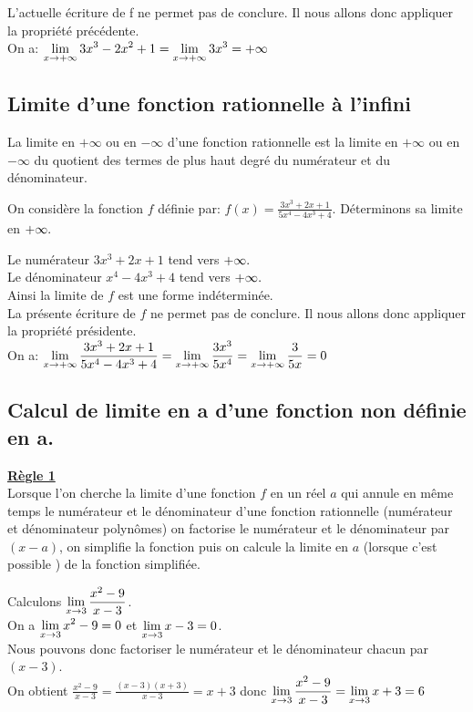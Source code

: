 L'actuelle écriture de f ne permet pas de conclure. Il nous allons donc appliquer la propriété précédente.\\
On a: \; $ \displaystyle \lim_{x\to +\infty}3x^{3}-2x^{2}+1=\displaystyle \lim_{x\to +\infty}3x^{3} =+\infty$



\subsection*{Limite d'une fonction rationnelle à l'infini}

\begin{property}
 La limite en $ +\infty $   ou  en $ -\infty $  d'une fonction rationnelle est la limite en  $ +\infty $   ou  en $ -\infty $  du quotient des termes de plus haut degré du numérateur et du dénominateur.
\end{property}

\begin{example}


On considère la fonction  $ f $ définie par:\; $ f(x)=\frac{3x^{3}+2x+1}{5x^{4}-4x^{3}+4} $. \;Déterminons sa limite en $ +\infty. $ 
\end{example}


Le numérateur   $ 3x^{3}+2x+1  $ tend vers $ +\infty. $\\
Le dénominateur $ x^{4}-4x^{3}+4 $ tend vers $ +\infty. $\\
Ainsi la limite de $ f $  est une forme indéterminée.\\
La présente écriture de $ f $ ne permet pas de conclure. Il nous allons donc appliquer la propriété présidente.\\
On  a:\;
$ \displaystyle \lim_{x\to +\infty}\frac{3x^{3}+2x+1}{5x^{4}-4x^{3}+4}=\displaystyle \lim_{x\to +\infty}\frac{3x^{3}}{5x^{4}}= \displaystyle \lim_{x\to +\infty}\frac{3}{5x}=0$


\subsection*{Calcul de limite  en  a  d'une fonction non définie en  a.}
\underline{\textbf{Règle 1}}\\
Lorsque l'on cherche la limite d'une fonction $ f $ en un réel $ a $ qui annule en
même temps le numérateur et le dénominateur d'une fonction rationnelle (numérateur et dénominateur polynômes) on factorise le numérateur et le
dénominateur par $( x - a )$, on simplifie la fonction puis on calcule la limite en $ a $ (lorsque c'est possible )  de la fonction simplifiée.
\begin{example}


Calculons $ \displaystyle \lim_{x\to 3}\frac{x^{2}-9}{x-3} $.\\ On a $ \displaystyle \lim_{x\to 3}x^{2}-9=0 $ et $ \displaystyle \lim_{x\to 3}x-3=0 $.\\Nous pouvons donc factoriser le numérateur et le dénominateur  chacun par $( x -3 )$.\\ On obtient  $ \frac{x^{2}-9}{x-3}=\frac{(x-3)(x+3)}{x-3}=x+3$ donc $ \displaystyle \lim_{x\to 3}\frac{x^{2}-9}{x-3}=\displaystyle \lim_{x\to 3}x+3 =6$
\end{example}



